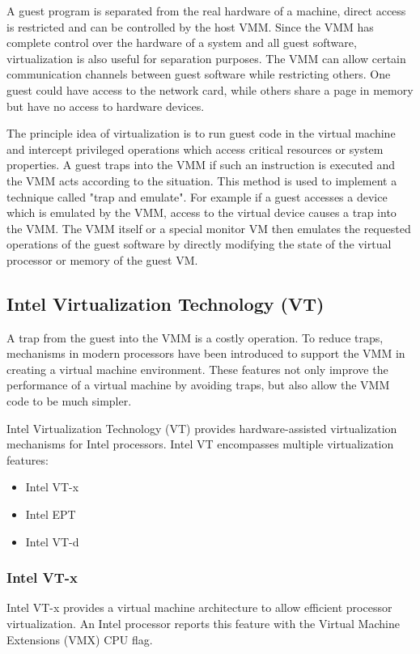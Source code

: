 A guest program is separated from the real hardware of a machine, direct access
is restricted and can be controlled by the host VMM. Since the VMM has complete
control over the hardware of a system and all guest software, virtualization is
also useful for separation purposes. The VMM can allow certain communication
channels between guest software while restricting others. One guest could have
access to the network card, while others share a page in memory but have no
access to hardware devices.

The principle idea of virtualization is to run guest code in the virtual machine
and intercept privileged operations which access critical resources or system
properties. A guest traps into the VMM if such an instruction is executed and
the VMM acts according to the situation. This method is used to implement a
technique called "trap and emulate". For example if a guest accesses a device
which is emulated by the VMM, access to the virtual device causes a trap into
the VMM. The VMM itself or a special monitor VM then emulates the requested
operations of the guest software by directly modifying the state of the virtual
processor or memory of the guest VM.

\subsection{Intel Virtualization Technology (VT)}
A trap from the guest into the VMM is a costly operation. To reduce traps,
mechanisms in modern processors have been introduced to support the VMM in
creating a virtual machine environment. These features not only improve the
performance of a virtual machine by avoiding traps, but also allow the VMM code
to be much simpler.

Intel Virtualization Technology (VT) provides hardware-assisted
virtualization mechanisms for Intel processors. Intel VT encompasses multiple
virtualization features:
\begin{itemize}
	\item Intel VT-x
	\item Intel EPT
	\item Intel VT-d
\end{itemize}

\subsubsection{Intel VT-x}
Intel VT-x provides a virtual machine architecture to allow
efficient processor virtualization. An Intel processor reports this feature
with the Virtual Machine Extensions (VMX) CPU flag.

